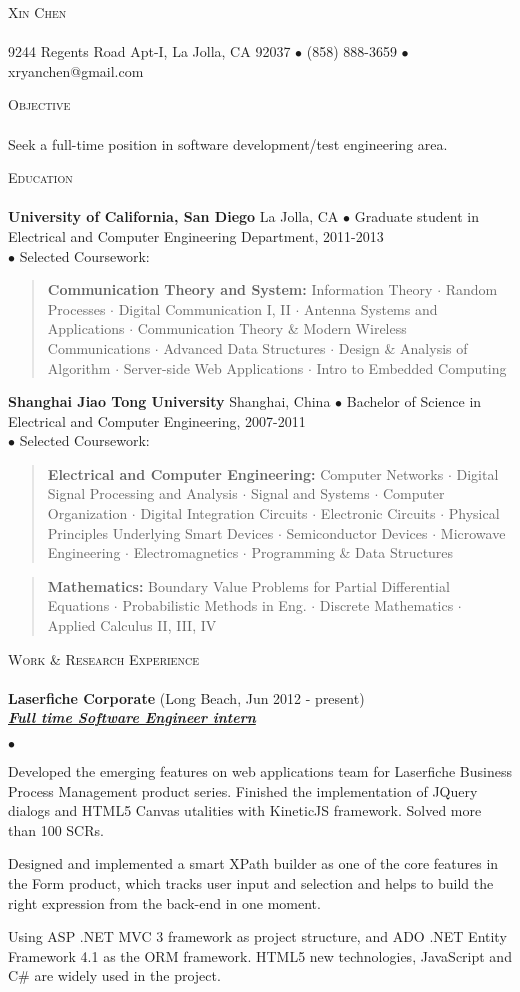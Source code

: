 \documentclass{article}
\newcommand{\area}[2]{\vspace*{-9pt} \begin{verse}\textbf{#1}   #2 \end{verse}  }
\newcommand{\lineunder}{\vspace*{-8pt} \\ \hspace*{-18pt} \hrulefill \\}
\newcommand{\header}[1]{{\hspace*{-15pt}\vspace*{6pt} \textsc{#1}} \vspace*{-6pt} \lineunder}
\newcommand{\employer}[3]{{ \textbf{#1} (#2)\\ \underline{\textbf{\emph{#3}}}\\  }}
\newcommand{\contact}[2]{
\vspace*{-8pt}
\begin{center}
{\LARGE \scshape {#1}}
\lineunder 
#2
\end{center}
\vspace*{-8pt}
}
\newenvironment{achievements}{\begin{list}{$\bullet$}{\topsep 0pt \itemsep -2pt}}{\vspace*{4pt}\end{list}}
\newcommand{\schoolwithcourses}[4]{
 \textbf{#1} #2 $\bullet$ #3\\ 
#4\\
\vspace*{5pt}
}
\begin{document}
\small
\smallskip
\vspace*{-95pt}

\contact{Xin Chen}
{9244 Regents Road Apt-I, La Jolla, CA 92037 $\bullet$ (858) 888-3659 $\bullet$ xryanchen@gmail.com}

\header{Objective}
Seek a full-time position in software development/test engineering area.

\header{Education}

\schoolwithcourses{University of California, San Diego}{La Jolla, CA}{Graduate student in Electrical and Computer Engineering Department, 2011-2013}
{$\bullet$ Selected Coursework:}
	\area{Communication Theory and System:}{ Information Theory $\cdot$ Random Processes $\cdot$ Digital Communication I, II $\cdot$ Antenna Systems and Applications $\cdot$ Communication Theory \& Modern Wireless Communications $\cdot$ Advanced Data Structures $\cdot$ Design \& Analysis of Algorithm $\cdot$ Server-side Web Applications $\cdot$ Intro to Embedded Computing}

\schoolwithcourses{Shanghai Jiao Tong University}{Shanghai, China}{Bachelor of Science in Electrical and Computer Engineering, 2007-2011}
{$\bullet$ Selected Coursework:}
	\area{Electrical and Computer Engineering:}{ Computer Networks $\cdot$ Digital Signal Processing and Analysis 
	      $\cdot$ Signal and Systems $\cdot$ Computer Organization $\cdot$ Digital Integration Circuits $\cdot$ Electronic Circuits $\cdot$ 
	      Physical Principles Underlying Smart Devices $\cdot$ Semiconductor Devices $\cdot$ Microwave Engineering 
	      $\cdot$ Electromagnetics $\cdot$ Programming \& Data Structures }
	\area{Mathematics:}{ Boundary Value Problems for Partial Differential Equations $\cdot$ Probabilistic Methods in Eng. 
	      $\cdot$ Discrete Mathematics $\cdot$ Applied Calculus II, III, IV}

\header{Work \& Research Experience}
\employer{Laserfiche Corporate}{Long Beach, Jun 2012 - present}{Full time Software Engineer intern}
	\begin{achievements}
	\item Developed the emerging features on web applications team for Laserfiche Business Process Management product series. Finished the implementation of JQuery dialogs and HTML5 Canvas utalities with KineticJS framework. Solved more than 100 SCRs.
	\item Designed and implemented a smart XPath builder as one of the core features in the Form product, which tracks user input and selection and helps to build the right expression from the back-end in one moment. 
	\item Using ASP .NET MVC 3 framework as project structure, and ADO .NET Entity Framework 4.1 as the ORM framework. HTML5 new technologies, JavaScript and C\# are widely used in the project.
	\end{achievements}
\end{document}
